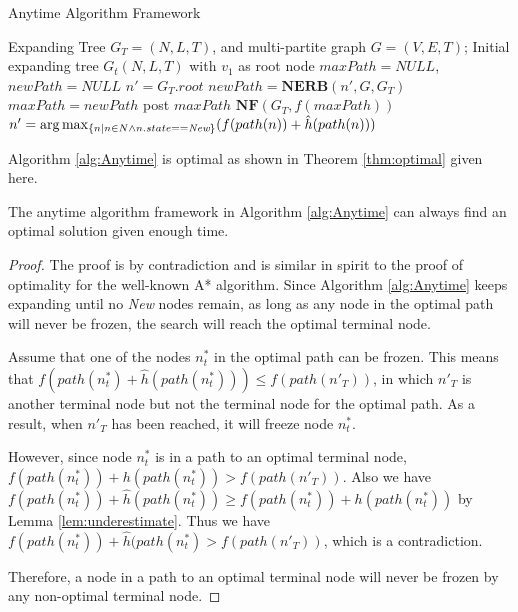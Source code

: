 \begin{algorithm}
\caption{Anytime Algorithm Framework}
\label{alg:Anytime}
\begin{algorithmic}[1]
\REQUIRE 
Expanding Tree $ G_{T} = (N, L, T) $, and multi-partite graph $ G = (V, E, T) $;
\STATE Initial expanding tree $ G_{t}(N, L, T) $ with $ v_{1} $ as root node
\STATE $ maxPath = NULL $, $ newPath = NULL $
\STATE $ n' = G_{T}.root $
\STATE $ newPath = \mathbf{NERB}( n', G, G_{T} ) $
\STATE $ maxPath = newPath $
\STATE post $ maxPath $
\ENDIF
\STATE $ \mathbf{NF}( G_{T}, f(maxPath) ) $
\STATE $ n' = \arg \max_{ \{n \mid n \in N \land n.state == \mbox{\emph{New}} \} } ( f(path(n)) + \hat{h}(path(n)) ) $
\ENDWHILE 
\end{algorithmic}
\end{algorithm}

Algorithm \ref{alg:Anytime} is optimal as shown in Theorem \ref{thm:optimal} given here.

\begin{thm} 
\label{thm:optimal}
The anytime algorithm framework in Algorithm \ref{alg:Anytime} can always find an optimal solution given enough time.
\end{thm}
\begin{proof}
The proof is by contradiction and is similar in spirit to the proof of optimality for the well-known A* algorithm.
Since Algorithm \ref{alg:Anytime} keeps expanding until no \emph{New} nodes remain, as long as any node in the optimal path will never be frozen, the search will reach the optimal terminal node.

Assume that one of the nodes $ n^{*}_{t} $ in the optimal path can be frozen.
This means that 
$ f(path(n^{*}_{t}) +  \hat{h}(path(n^{*}_{t})) ) \leq f(path(n'_{T})) $,
in which $ n'_{T} $ is another terminal node but not the terminal node for the optimal path.
As a result, when $ n'_{T} $ has been reached, it will freeze node $ n^{*}_{t} $. 

However, since node $ n^{*}_{t} $ is in a path to an optimal terminal node, $ f(path(n^{*}_{t})) + h(path(n^{*}_{t})) > f(path(n'_{T})) $.
Also we have $ f(path(n^{*}_{t})) + \hat{h}(path(n^{*}_{t})) \geq f(path(n^{*}_{t})) + h(path(n^{*}_{t})) $ by Lemma \ref{lem:underestimate}.
Thus we have $ f(path(n^{*}_{t})) + \hat{h}(path(n^{*}_{t}) > f(path(n'_{T})) $, which is a contradiction.

Therefore, a node in a path to an optimal terminal node will never be frozen by any non-optimal terminal node.
\end{proof}